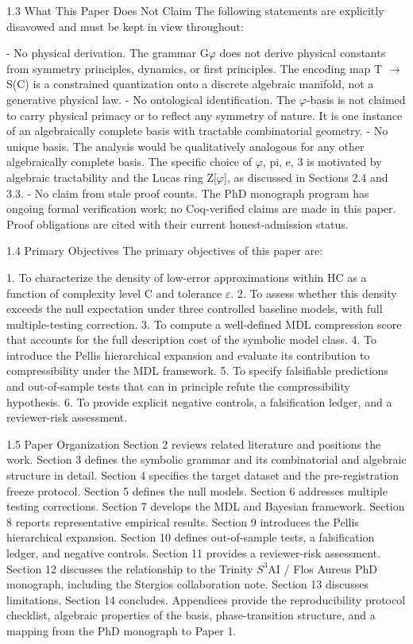   1.3 What This Paper Does Not Claim
  The following statements are explicitly disavowed and must be kept in view throughout:

  - No physical derivation. The grammar G$\varphi$ does not derive physical constants from
  symmetry principles, dynamics, or first principles. The encoding map T $\rightarrow$ S(C) is a
  constrained quantization onto a discrete algebraic manifold, not a generative physical
  law.
  - No ontological identification. The $\varphi$-basis is not claimed to carry physical primacy or to
  reflect any symmetry of nature. It is one instance of an algebraically complete basis
  with tractable combinatorial geometry.
  - No unique basis. The analysis would be qualitatively analogous for any other
  algebraically complete basis. The specific choice of {$\varphi$, pi, e, 3} is motivated by
  algebraic tractability and the Lucas ring Z[$\varphi$], as discussed in Sections 2.4 and 3.3.
  - No claim from stale proof counts. The PhD monograph program has ongoing formal
  verification work; no Coq-verified claims are made in this paper. Proof obligations are
  cited with their current honest-admission status.

  1.4 Primary Objectives
  The primary objectives of this paper are:

  1. To characterize the density of low-error approximations within HC as a function of
  complexity level C and tolerance $\varepsilon$.
  2. To assess whether this density exceeds the null expectation under three controlled
  baseline models, with full multiple-testing correction.
  3. To compute a well-defined MDL compression score that accounts for the full
  description cost of the symbolic model class.
  4. To introduce the Pellis hierarchical expansion and evaluate its contribution to
  compressibility under the MDL framework.
  5. To specify falsifiable predictions and out-of-sample tests that can in principle refute
  the compressibility hypothesis.
  6. To provide explicit negative controls, a falsification ledger, and a reviewer-risk
  assessment.

  1.5 Paper Organization
  Section 2 reviews related literature and positions the work. Section 3 defines the
  symbolic grammar and its combinatorial and algebraic structure in detail. Section 4
  specifies the target dataset and the pre-registration freeze protocol. Section 5 defines
  the null models. Section 6 addresses multiple testing corrections. Section 7 develops
  the MDL and Bayesian framework. Section 8 reports representative empirical results.
  Section 9 introduces the Pellis hierarchical expansion. Section 10 defines out-of-sample
  tests, a falsification ledger, and negative controls. Section 11 provides a reviewer-risk
  assessment. Section 12 discusses the relationship to the Trinity $S^{3}$AI / Flos Aureus PhD
  monograph, including the Stergios collaboration note. Section 13 discusses limitations.
  Section 14 concludes. Appendices provide the reproducibility protocol checklist,
  algebraic properties of the basis, phase-transition structure, and a mapping from the
  PhD monograph to Paper 1.

